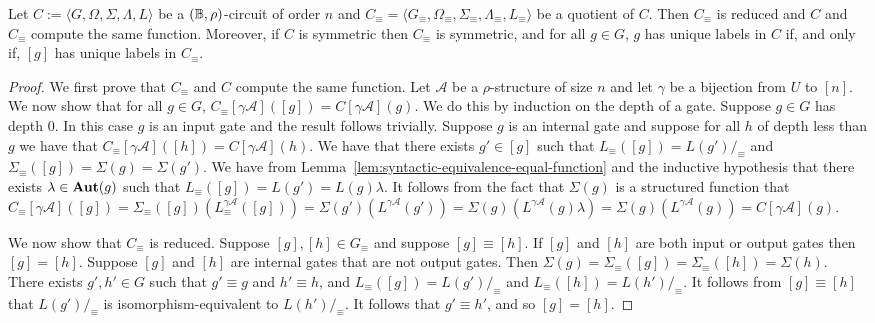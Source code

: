 \documentclass[../paper.tex]{subfiles}
\begin{document}
\begin{lem}
  Let $C := \langle G, \Omega, \Sigma, \Lambda, L\rangle$ be a $(\mathbb{B},
  \rho)$-circuit of order $n$ and $C_{\equiv} = \langle G_\equiv ,
  \Omega_\equiv, \Sigma_\equiv , \Lambda_\equiv, L_\equiv \rangle$ be a quotient
  of $C$. Then $C_\equiv$ is reduced and $C$ and $C_{\equiv}$ compute the same
  function. Moreover, if $C$ is symmetric then $C_{\equiv}$ is symmetric, and
  for all $g \in G$, $g$ has unique labels in $C$ if, and only if, $[g]$ has
  unique labels in $C_{\equiv}$.
  \label{lem:quotient-circuits-preserve}
\end{lem}
\begin{proof}
  We first prove that $C_\equiv$ and $C$ compute the same function. Let
  $\mathcal{A}$ be a $\rho$-structure of size $n$ and let $\gamma$ be a
  bijection from $U$ to $[n]$. We now show that for all $g \in G$, $C_\equiv
  [\gamma \mathcal{A}]([g]) = C[\gamma \mathcal{A}](g)$. We do this by induction
  on the depth of a gate. Suppose $g \in G$ has depth $0$. In this case $g$ is
  an input gate and the result follows trivially. Suppose $g$ is an internal
  gate and suppose for all $h$ of depth less than $g$ we have that
  $C_\equiv[\gamma \mathcal{A}]([h]) = C[\gamma \mathcal{A}](h)$. We have that
  there exists $g' \in [g]$ such that $L_\equiv ([g]) = L(g') /_\equiv$ and
  $\Sigma_\equiv([g]) = \Sigma (g) = \Sigma (g')$. We have from
  Lemma~\ref{lem:syntactic-equivalence-equal-function} and the inductive
  hypothesis that there exists $\lambda \in \text{\textbf{Aut}}(g)$ such that $L_\equiv ([g]) =
  L(g') = L(g) \lambda$. It follows from the fact that $\Sigma(g)$ is a
  structured function that $C_\equiv[\gamma \mathcal{A}]([g]) = \Sigma_\equiv
  ([g])(L^{\gamma \mathcal{A}}_\equiv([g])) = \Sigma (g') (L^{\gamma
    \mathcal{A}}(g')) = \Sigma (g)(L^{\gamma \mathcal{A}}(g) \lambda) = \Sigma
  (g) (L^{\gamma \mathcal{A}}(g)) = C[\gamma \mathcal{A}](g)$.
  
  We now show that $C_\equiv$ is reduced. Suppose $[g], [h] \in G_\equiv$ and
  suppose $[g] \equiv [h]$. If $[g]$ and $[h]$ are both input or output gates
  then $[g] = [h]$. Suppose $[g]$ and $[h]$ are internal gates that are not
  output gates. Then $\Sigma (g) = \Sigma_\equiv ([g]) = \Sigma_\equiv([h]) =
  \Sigma(h)$. There exists $g', h' \in G$ such that $g' \equiv g$ and $h' \equiv
  h$, and $L_\equiv ([g]) = L(g') /_\equiv$ and $L_\equiv ([h]) = L(h')
  /_\equiv$. It follows from $[g] \equiv [h]$ that $L(g') /_\equiv$ is
  isomorphism-equivalent to $L(h') /_\equiv$. It follows that $g' \equiv h'$,
  and so $[g] = [h]$.


\end{proof}
\end{document}
